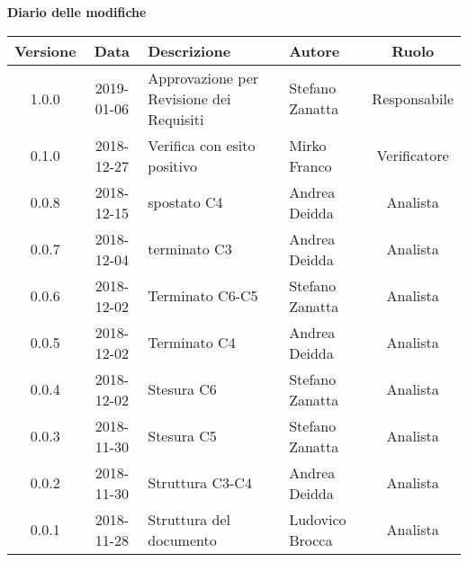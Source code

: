 \begin{center}
		\textbf{Diario delle modifiche}
	\end{center}
	\begin{center}
		\begin{tabularx}{\textwidth}{|c|c|X|X|c|}
			\hline
			\textbf{Versione} & \textbf{Data} & \textbf{Descrizione} & \textbf{Autore} & \textbf{Ruolo} \\
			\hline
			1.0.0 & 2019-01-06 & Approvazione per Revisione dei Requisiti & Stefano Zanatta & Responsabile \\
			\hline
			0.1.0 & 2018-12-27 & Verifica con esito positivo & Mirko Franco & Verificatore \\
			\hline 
			0.0.8 &  2018-12-15 & spostato C4 & Andrea Deidda & Analista \\
			\hline
			0.0.7 &  2018-12-04 & terminato C3 & Andrea Deidda & Analista \\
			\hline
			0.0.6 & 2018-12-02 & Terminato C6-C5 & Stefano Zanatta & Analista \\
			\hline
			0.0.5 & 2018-12-02 & Terminato C4 & Andrea Deidda & Analista \\
			\hline
			0.0.4 & 2018-12-02 & Stesura C6 & Stefano Zanatta & Analista \\
			\hline
			0.0.3 & 2018-11-30 & Stesura C5 & Stefano Zanatta & Analista \\
			\hline
			0.0.2 & 2018-11-30 & Struttura C3-C4 & Andrea Deidda & Analista \\
			\hline
			0.0.1 &  2018-11-28& Struttura del documento & Ludovico Brocca & Analista\\
			\hline
		\end{tabularx}
	\end{center}
\newpage